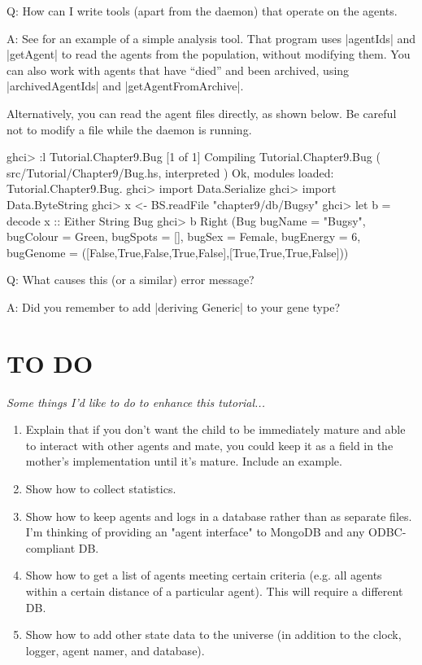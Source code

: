 \documentclass[a4paper,10pt]{report}
\begin{document}
Q: How can I write tools (apart from the daemon) that operate on the agents.

A: See  for an example of a simple analysis tool.
That program uses |agentIds| and |getAgent| to read the agents from the
population, without modifying them.
You can also work with agents that have ``died'' and been archived,
using |archivedAgentIds| and |getAgentFromArchive|.

Alternatively, you can read the agent files directly, as shown below.
Be careful not to modify a file while the daemon is running.

\begin{code}
ghci> :l Tutorial.Chapter9.Bug
[1 of 1] Compiling Tutorial.Chapter9.Bug ( src/Tutorial/Chapter9/Bug.hs, interpreted )
Ok, modules loaded: Tutorial.Chapter9.Bug.
ghci> import Data.Serialize
ghci> import Data.ByteString
ghci> x <- BS.readFile "chapter9/db/Bugsy"
ghci> let b = decode x :: Either String Bug
ghci> b
Right (Bug {bugName = "Bugsy", bugColour = Green, bugSpots = [], bugSex = Female,
bugEnergy = 6, bugGenome = ([False,True,False,True,False],[True,True,True,False])})
\end{code}

Q: What causes this (or a similar) error message?

A: Did you remember to add |deriving Generic| to your gene type?

\chapter{TO DO}
\textit{Some things I'd like to do to enhance this tutorial...}

\begin{enumerate}
\item Explain that if you don't want the child to be immediately mature
and able to interact with other agents and mate,
you could keep it as a field in the mother's implementation
until it's mature.
Include an example.

\item Show how to collect statistics.

\item Show how to keep agents and logs in a database rather than as separate
files. I'm thinking of providing an "agent interface" to MongoDB and any
ODBC-compliant DB.

\item Show how to get a list of agents meeting certain criteria 
(e.g. all agents within a certain distance of a particular agent).
This will require a different DB.

\item Show how to add other state data to the universe (in addition to
the clock, logger, agent namer, and database).
\end{enumerate}
\end{document}

